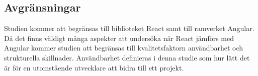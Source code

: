 \subsection{Avgränsningar}
\label{subsec:axel-delimitations}
Studien kommer att begränsas till biblioteket React samt till ramverket Angular. Då det finns väldigt många aspekter att undersöka när React jämförs med Angular kommer studien att begränsas till kvalitetsfaktorn användbarhet och strukturella skillnader. Användbarhet definieras i denna studie som hur lätt det är för en utomstående utvecklare att bidra till ett projekt.

